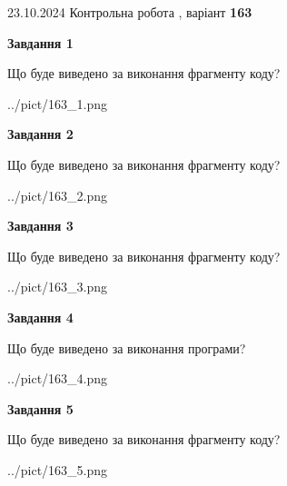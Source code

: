 \documentclass[12pt, ukrainian]{article}
\begin{document}
{\Large{23.10.2024 Контрольна робота , варіант  \No \textbf { 163 }\par}}
{
\begin {large}
{\begin {center}\textbf{Завдання 1}\end {center}}

Що буде виведено за виконання фрагменту коду?\par
\begin{center}
	{../pict/163_1.png}
\end{center}
\newpage

{\begin {center}\textbf{Завдання 2}\end {center}}

Що буде виведено за виконання фрагменту коду?\par
\begin{center}
	{../pict/163_2.png}
\end{center}
\newpage

{\begin {center}\textbf{Завдання 3}\end {center}}

Що буде виведено за виконання фрагменту коду?\par
\begin{center}
	{../pict/163_3.png}
\end{center}
\newpage

{\begin {center}\textbf{Завдання 4}\end {center}}

Що буде виведено за виконання програми?\par
\begin{center}
	{../pict/163_4.png}
\end{center}
\newpage

{\begin {center}\textbf{Завдання 5}\end {center}}

Що буде виведено за виконання фрагменту коду?\par
\begin{center}
	{../pict/163_5.png}
\end{center}
\newpage


\end{large}}
\end{document}
